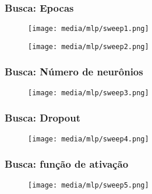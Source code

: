 \documentclass[a4paper]{article}
\begin{document}
\subsubsection{Busca: Epocas}

\begin{figure}[H]
    \centering   %
    \centerline{\texttt{[image: media/mlp/sweep1.png]}}
    \label{fig:fig2}  %
\end{figure}

\begin{figure}[H]
    \centering   %
    \centerline{\texttt{[image: media/mlp/sweep2.png]}}
    \label{fig:fig2}  %
\end{figure}

\subsubsection{Busca: Número de neurônios}
\begin{figure}[H]
    \centering   %
    \centerline{\texttt{[image: media/mlp/sweep3.png]}}
    \label{fig:fig2}  %
\end{figure}

\subsubsection{Busca: Dropout}
\begin{figure}[H]
    \centering   %
    \centerline{\texttt{[image: media/mlp/sweep4.png]}}
    \label{fig:fig2}  %
\end{figure}

\subsubsection{Busca: função de ativação}
\begin{figure}[H]
    \centering   %
    \centerline{\texttt{[image: media/mlp/sweep5.png]}}
    \label{fig:fig2}  %
\end{figure}
\end{document}
